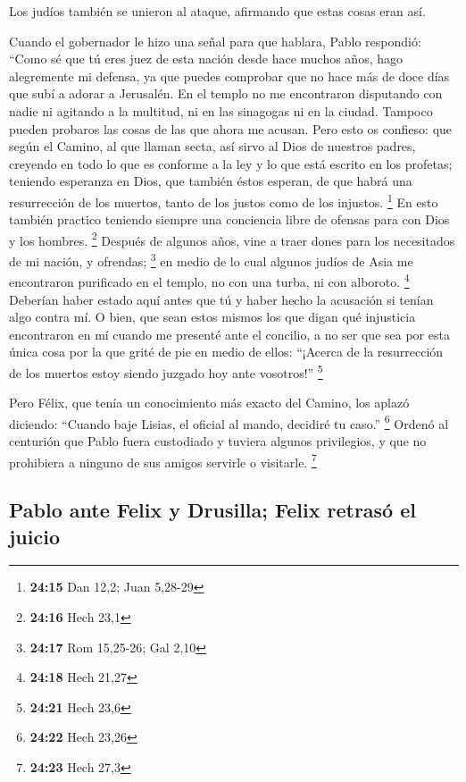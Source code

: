  Los judíos también se unieron al ataque, afirmando que
estas cosas eran así.

 Cuando el gobernador le hizo una señal para que hablara,
Pablo respondió: ``Como sé que tú eres juez de esta nación desde hace
muchos años, hago alegremente mi defensa,  ya que puedes
comprobar que no hace más de doce días que subí a adorar a Jerusalén.
 En el templo no me encontraron disputando con nadie ni
agitando a la multitud, ni en las sinagogas ni en la ciudad.
 Tampoco pueden probaros las cosas de las que ahora me
acusan.  Pero esto os confieso: que según el Camino, al
que llaman secta, así sirvo al Dios de nuestros padres, creyendo en todo
lo que es conforme a la ley y lo que está escrito en los profetas;
 teniendo esperanza en Dios, que también éstos esperan,
de que habrá una resurrección de los muertos, tanto de los justos como
de los injustos. \footnote{\textbf{24:15} Dan 12,2; Juan 5,28-29}
 En esto también practico teniendo siempre una conciencia
libre de ofensas para con Dios y los hombres. \footnote{\textbf{24:16}
  Hech 23,1}  Después de algunos años, vine a traer dones
para los necesitados de mi nación, y ofrendas; \footnote{\textbf{24:17}
  Rom 15,25-26; Gal 2,10}  en medio de lo cual algunos
judíos de Asia me encontraron purificado en el templo, no con una turba,
ni con alboroto. \footnote{\textbf{24:18} Hech 21,27} 
Deberían haber estado aquí antes que tú y haber hecho la acusación si
tenían algo contra mí.  O bien, que sean estos mismos los
que digan qué injusticia encontraron en mí cuando me presenté ante el
concilio,  a no ser que sea por esta única cosa por la
que grité de pie en medio de ellos: ``¡Acerca de la resurrección de los
muertos estoy siendo juzgado hoy ante vosotros!'' \footnote{\textbf{24:21}
  Hech 23,6}

 Pero Félix, que tenía un conocimiento más exacto del
Camino, los aplazó diciendo: ``Cuando baje Lisias, el oficial al mando,
decidiré tu caso.'' \footnote{\textbf{24:22} Hech 23,26} 
Ordenó al centurión que Pablo fuera custodiado y tuviera algunos
privilegios, y que no prohibiera a ninguno de sus amigos servirle o
visitarle. \footnote{\textbf{24:23} Hech 27,3}

\hypertarget{pablo-ante-felix-y-drusilla-felix-retrasuxf3-el-juicio}{%
\subsection{Pablo ante Felix y Drusilla; Felix retrasó el
juicio}\label{pablo-ante-felix-y-drusilla-felix-retrasuxf3-el-juicio}}

